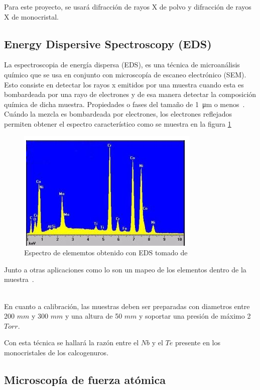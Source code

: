 \documentclass{article}
\begin{document}
Para este proyecto, se usará difracción de rayos X de polvo y difracción de rayos X de monocristal.

\subsection{Energy Dispersive Spectroscopy (EDS)}

La espectroscopia de energía dispersa (EDS), es una técnica de microanálisis químico que se usa en conjunto con microscopía de escaneo electrónico (SEM). Esto consiste en detectar los rayos x emitidos por una muestra cuando esta es  bombardeada por una rayo de electrones y de esa manera detectar la composición química de dicha muestra. Propiedades o fases del tamaño de \SI{1}{\micro\metre} o menos~\cite{EDS}.\\

Cuándo la mezcla es bombardeada por electrones, los electrones reflejados permiten obtener el espectro característico como se muestra en la figura \ref{EDS}\\ 

\begin{figure}
    \centering
    \includegraphics{Proyecto_final/Propuesta/EDSDiagram.png}
    \caption{Espectro de elememtos obtenido con EDS tomado de \cite{EDS}}
    \label{EDS}
\end{figure}

Junto a otras aplicaciones como lo son un mapeo de los elementos dentro de la muestra~\cite{EDS}.\\\

En cuanto a calibración, las muestras deben ser preparadas con diametros entre 200 $mm$ y 300 $mm$ y una altura de 50 $mm$ y soportar una presión de máximo 2 $Torr$.

Con esta técnica se hallará la razón entre el $Nb$ y el $Te$ presente en los monocristales de los calcogenuros.

\subsection{Microscopía de fuerza atómica}
\end{document}
